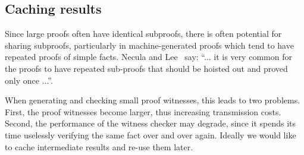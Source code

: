 \documentclass{llncs}
\begin{document}



\subsection{Caching results}
\label{sec:tabling}
Since large proofs often have identical subproofs, there is often
potential for sharing subproofs, particularly in machine-generated
proofs which tend to have repeated proofs of simple facts.
Necula and Lee~\cite{NeculaLee+97:resource} say:
%
``... it is very common for the proofs to have  
repeated sub-proofs that should be hoisted out and 
proved only once ...''.


When generating and checking small proof witnesses, this leads to two
problems.  First, the proof witnesses become larger, thus increasing
transmission costs. Second, the performance of the witness checker may
degrade, since it spends its time uselessly verifying the same fact
over and over again. Ideally we would like to cache intermediate
results and re-use them later. 
\end{document}
